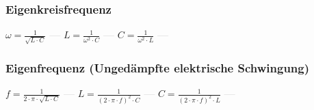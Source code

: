 \subsubsection{Eigenkreisfrequenz} 
\begin{minipage}{0.45\textwidth} 
\end{minipage} 
\begin{minipage}{0.45\textwidth} 
 
\end{minipage} 
$ \omega  = \frac{ 1}{\sqrt{L\cdot C}} $ \textcolor{lightgray}{\textbf{---}} 
$ L= \frac{ 1}{\omega ^{2} \cdot C} $ \textcolor{lightgray}{\textbf{---}} 
$ C = \frac{ 1}{\omega ^{2} \cdot L} $ \textcolor{lightgray}{\textbf{---}} 

\subsubsection{Eigenfrequenz (Ungedämpfte elektrische Schwingung)} 
\begin{minipage}{0.45\textwidth} 
\end{minipage} 
\begin{minipage}{0.45\textwidth} 
 
\end{minipage} 
$ f = \frac{ 1}{2\cdot \pi \cdot \sqrt{L\cdot C}} $ \textcolor{lightgray}{\textbf{---}} 
$ L = \frac{ 1}{(2\cdot \pi \cdot f)^{2} \cdot C} $ \textcolor{lightgray}{\textbf{---}} 
$ C = \frac{ 1}{(2\cdot \pi \cdot f)^{2} \cdot L} $ \textcolor{lightgray}{\textbf{---}} 


